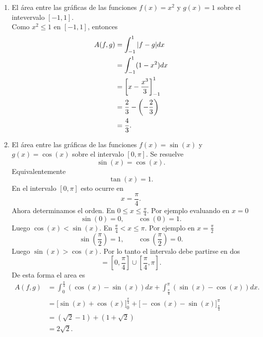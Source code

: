 \documentclass[12pt,a4paper]{article}
\begin{document}
    \begin{solucion}
        \begin{enumerate}
            \item[(a)] El área entre las gráficas de las funciones $f(x)=x^{2}$ y $g(x)=1$ sobre el intevervalo $[-1,1]$.\\
            Como $x^{2}\leq1$ en $[-1,1]$, entonces
            \begin{align*}
                A(f,g)&=\int_{-1}^{1}\abs{f-g}dx\\
                &=\int_{-1}^{1}(1-x^{2})dx\\
                &=\left[x-\frac{x^{3}}{3}\right]_{-1}^{1}\\
                &=\frac{2}{3}-\left(-\frac{2}{3}\right)\\
                &=\frac{4}{3}.
            \end{align*}
            \item[(b)] El área entre las gráficas de las funciones $f(x)=\sin(x)$ y $g(x)=\cos(x)$ sobre el intervalo
            $[0,\pi]$.
            Se resuelve
            \begin{equation*}
                \sin(x)=\cos(x).
            \end{equation*}
            Equivalentemente
            \begin{equation*}
                \tan(x)=1.
            \end{equation*}
            En el intervalo $[0,\pi]$ esto ocurre en
            \begin{equation*}
                x=\frac{\pi}{4}.
            \end{equation*}
            Ahora determinamos el orden. En $0\leq x\leq\frac{\pi}{4}$. Por ejemplo evaluando en $x=0$
            \begin{equation*}
                \sin(0)=0,\qquad\cos(0)=1.
            \end{equation*}
            Luego $\cos(x)\lt\sin(x)$. En $\frac{\pi}{4}\lt x\leq\pi$. Por ejemplo en $x=\frac{\pi}{2}$
            \begin{equation*}
                \sin(\frac{\pi}{2})=1,\qquad\cos(\frac{\pi}{2})=0.
            \end{equation*}
            Luego $\sin(x)\gt\cos(x)$. Por lo tanto el intervalo debe partirse en dos
            \begin{equation*}
                [0,\pi]=[0,\frac{\pi}{4}]\cup[\frac{\pi}{4},\pi].
            \end{equation*}
            De esta forma el area es
            \begin{align*}
                A(f,g)&=\int_{0}^{\frac{\pi}{4}}(\cos(x)-\sin(x))dx+\int_{\frac{\pi}{4}}^{\pi}(\sin(x)-\cos(x))dx.\\
                &=\big[\sin(x)+\cos(x)\big]_{0}^{\frac{\pi}{4}}+\big[-\cos(x)-\sin(x)\big]_{\frac{\pi}{4}}^{\pi}\\
                &=(\sqrt{2}-1)+(1+\sqrt{2})\\
                &=2\sqrt{2}.
            \end{align*}
        \end{enumerate}
    \end{solucion}
\end{document}
